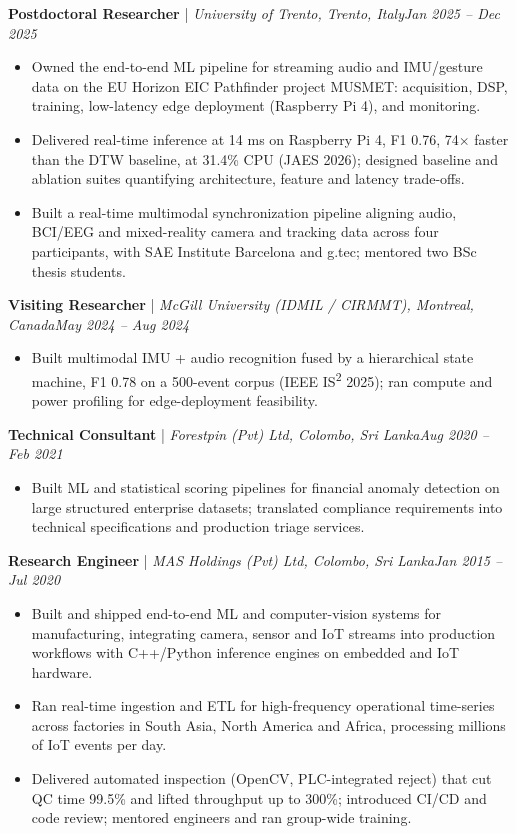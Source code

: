 \documentclass[11pt]{article}
\newenvironment{cvrole}[5]{%
  \par\noindent\textbf{\large #1} | \textit{\small #2, #3}\hfill \textit{\small #4 -- #5}\par
  \begin{itemize}[leftmargin=2em, itemsep=-0.3em, topsep=-0.5em]%
}{%
  \end{itemize}\par\noindent\mbox{}\par\vspace{0.1em}%
}
\begin{document}
\begin{cvrole}{Postdoctoral Researcher}{University of Trento}{Trento, Italy}{Jan 2025}{Dec 2025}
    \item Owned the end-to-end ML pipeline for streaming audio and IMU/gesture data on the EU Horizon EIC Pathfinder project MUSMET: acquisition, DSP, training, low-latency edge deployment (Raspberry Pi 4), and monitoring.
    \item Delivered real-time inference at 14 ms on Raspberry Pi 4, F1 0.76, 74$\times$ faster than the DTW baseline, at 31.4\% CPU (JAES 2026); designed baseline and ablation suites quantifying architecture, feature and latency trade-offs.
    \item Built a real-time multimodal synchronization pipeline aligning audio, BCI/EEG and mixed-reality camera and tracking data across four participants, with SAE Institute Barcelona and g.tec; mentored two BSc thesis students.
\end{cvrole}

\begin{cvrole}{Visiting Researcher}{McGill University (IDMIL / CIRMMT)}{Montreal, Canada}{May 2024}{Aug 2024}
    \item Built multimodal IMU + audio recognition fused by a hierarchical state machine, F1 0.78 on a 500-event corpus (IEEE IS\textsuperscript{2} 2025); ran compute and power profiling for edge-deployment feasibility.
\end{cvrole}

\begin{cvrole}{Technical Consultant}{Forestpin (Pvt) Ltd}{Colombo, Sri Lanka}{Aug 2020}{Feb 2021}
    \item Built ML and statistical scoring pipelines for financial anomaly detection on large structured enterprise datasets; translated compliance requirements into technical specifications and production triage services.
\end{cvrole}

\begin{cvrole}{Research Engineer}{MAS Holdings (Pvt) Ltd}{Colombo, Sri Lanka}{Jan 2015}{Jul 2020}
    \item Built and shipped end-to-end ML and computer-vision systems for manufacturing, integrating camera, sensor and IoT streams into production workflows with C++/Python inference engines on embedded and IoT hardware.
    \item Ran real-time ingestion and ETL for high-frequency operational time-series across factories in South Asia, North America and Africa, processing millions of IoT events per day.
    \item Delivered automated inspection (OpenCV, PLC-integrated reject) that cut QC time 99.5\% and lifted throughput up to 300\%; introduced CI/CD and code review; mentored engineers and ran group-wide training.
\end{cvrole}
\end{document}
